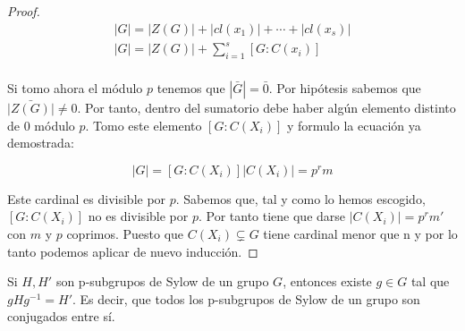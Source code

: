 \documentclass[nochap]{apuntes}
\begin{document}
\begin{proof}
  \begin{gather*}
  |G| = |Z(G)| + |cl(x_1)| + \dotsb + |cl(x_s)| \\
  |G| = |Z(G)| + \sum_{i=1}^{s}[G:C(x_i)] \\
  \end{gather*}
  
  Si tomo ahora el módulo $p$ tenemos que $|\bar{G}|=\bar{0}$. Por hipótesis sabemos que $\bar{|Z(G)|} \neq 0$. Por tanto, dentro del 
  sumatorio debe haber algún elemento distinto de 0 módulo $p$. Tomo este elemento $[G:C(X_i)]$  y formulo la ecuación ya
  demostrada:
  
  \[|G|=[G:C(X_i)]|C(X_i)|=p^{r}m\] 
  
  Este cardinal es divisible por $p$. Sabemos que, tal y como lo hemos escogido, $[G:C(X_i)]$  no es divisible por $p$. Por tanto tiene que darse $|C(X_i)|=p^{r}m'$  con $m$ y $p$ coprimos. Puesto que $C(X_i) \varsubsetneq G$  tiene cardinal menor que n y por lo tanto podemos aplicar de nuevo inducción.
\end{proof}

\begin{theorem}
Si $H, H'$ son p-subgrupos de Sylow de un grupo $G$, entonces existe $g∈G$ tal que $gHg^{-1}=H'$. Es decir, que todos los p-subgrupos de Sylow de un grupo son conjugados entre sí.
\end{theorem}
\end{document}
